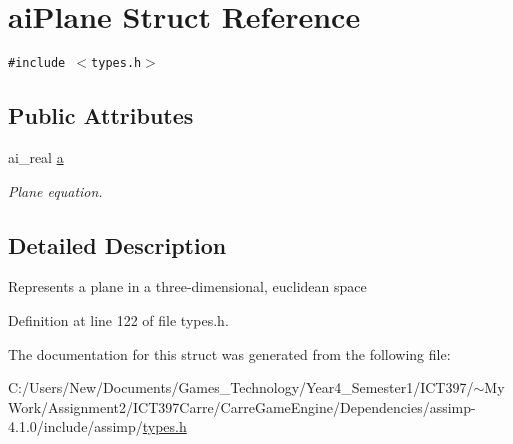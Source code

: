 \hypertarget{structai_plane}{
\section{aiPlane Struct Reference}
\label{structai_plane}
}
{\tt \#include $<$types.h$>$}

\subsection*{Public Attributes}
\begin{CompactItemize}
\item 
\hypertarget{structai_plane_0e2f46be0d810fef7633c9d4b77c5556}{
ai\_\-real \hyperlink{structai_plane_0e2f46be0d810fef7633c9d4b77c5556}{a}}
\label{structai_plane_0e2f46be0d810fef7633c9d4b77c5556}

\begin{CompactList}\small\item\em Plane equation. \item\end{CompactList}\end{CompactItemize}


\subsection{Detailed Description}
Represents a plane in a three-dimensional, euclidean space 

Definition at line 122 of file types.h.

The documentation for this struct was generated from the following file:\begin{CompactItemize}
\item 
C:/Users/New/Documents/Games\_\-Technology/Year4\_\-Semester1/ICT397/$\sim$My Work/Assignment2/ICT397Carre/CarreGameEngine/Dependencies/assimp-4.1.0/include/assimp/\hyperlink{types_8h}{types.h}\end{CompactItemize}
